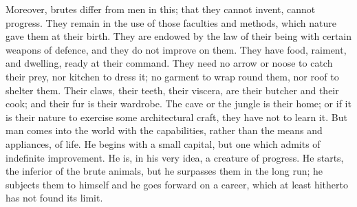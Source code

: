 Moreover, brutes differ from
men in this; that they cannot invent, cannot progress. They remain in
the use of those faculties and methods, which nature gave them at
their birth. They are endowed by the law of their being with certain
weapons of defence, and they do not improve on them. They have food,
raiment, and dwelling, ready at their command. They need no arrow or
noose to catch their prey, nor kitchen to dress it; no garment to wrap
round them, nor roof to shelter them. Their claws, their teeth, their
viscera, are their butcher and their cook; and their fur is their
wardrobe. The cave or the jungle is their home; or if it is their
nature to exercise some architectural craft, they have not to learn
it. But man comes into the world with the capabilities, rather than
the means and appliances, of life. He begins with a small capital, but
one which admits of indefinite improvement. He is, in his very idea, a
creature of progress. He starts, the inferior of the brute animals,
but he surpasses them in the long run; he subjects them to himself and
he goes forward on a career, which at least hitherto has not found its
limit.

